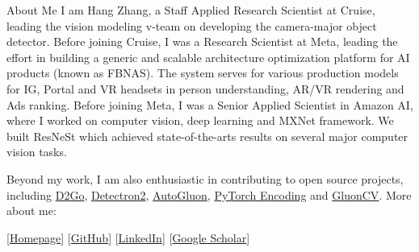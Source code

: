 \documentclass{resume} %
\begin{document}
\begin{rSection}{About Me}
I am Hang Zhang, a Staff Applied Research Scientist at Cruise, leading the vision modeling v-team on developing the camera-major object detector. 
Before joining Cruise, I was a Research Scientist at Meta, leading the effort in building a generic and scalable architecture optimization platform for AI products (known as FBNAS). The system serves for various production models for IG, Portal and VR headsets in person understanding, AR/VR rendering and Ads ranking.
Before joining Meta, I was a Senior Applied Scientist in Amazon AI, where I worked on computer vision, deep learning and MXNet framework. We built ResNeSt which achieved state-of-the-arts results on several major computer vision tasks.


Beyond my work, I am also enthusiastic in contributing to open source projects, including \href{https://github.com/facebookresearch/d2go}{D2Go}, \href{https://github.com/facebookresearch/detectron2}{Detectron2}, \href{https://github.com/awslabs/autogluon/}{AutoGluon}, \href{https://github.com/zhanghang1989/PyTorch-Encoding}{PyTorch Encoding} and \href{https://github.com/dmlc/gluon-cv}{GluonCV}. More about me:


[\href{https://hangzhang.org/}{Homepage}] [\href{https://github.com/zhanghang1989}{GitHub}] 
[\href{https://www.linkedin.com/in/zhanghang0704}{LinkedIn}] 
[\href{https://scholar.google.com/citations?user=gCoWdkUAAAAJ}{Google Scholar}]
\end{rSection}


\newcommand{\RNum}[1]{\uppercase\expandafter{\romannumeral #1\relax}}
\end{document}
